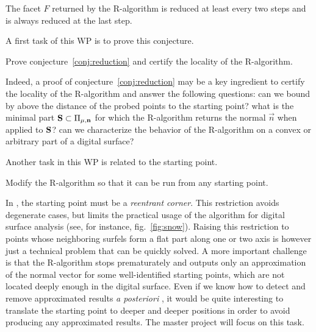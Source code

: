 \begin{Conjecture}
  \label{conj:reduction}
  The facet $F$ returned by the R-algorithm is reduced at least every two steps and
  is always reduced at the last step.  
\end{Conjecture}

A first task of this WP is to prove this conjecture.

\begin{Task}
  \label{task:reduction}
  Prove conjecture~\ref{conj:reduction} and certify the locality of the R-algorithm. 
\end{Task}

Indeed, a proof of conjecture~\ref{conj:reduction} may be a key ingredient
to certify the locality of the R-algorithm and answer
the following questions: can we bound by above the distance of the probed
points to the starting point? 
what is the minimal part $\mathbf{S} \subset \Pi_{\mu,\mathbf{n}}$ for which the
R-algorithm returns the normal $\vec{n}$ when applied to $\mathbf{S}$?
can we characterize the behavior of the R-algorithm on a convex or arbitrary
part of a digital surface?

Another task in this WP is related to the starting point.

\begin{Task}
  \label{task:start}
  Modify the R-algorithm so that it can be run from any starting point. 
\end{Task}

In \cite{LPRJMIV2017}, the starting point must be a \emph{reentrant corner}.
This restriction avoids degenerate cases, but
limits the practical usage of the algorithm for digital surface analysis
(see, for instance, fig.~\ref{fig:snow}). Raising this restriction to points whose neighboring
surfels form a flat part along one or two axis is however just a technical
problem that can be quickly solved. A more important challenge is that the R-algorithm
stops prematurately and outputs only an approximation of the normal vector for some
well-identified starting points, which are not located deeply enough in the digital
surface. Even if we know how to detect and remove approximated results
\emph{a posteriori} \cite{LPRJMIV2017}, it would be quite interesting to translate
the starting point to deeper and deeper positions in order to avoid producing any
approximated results. The master project will focus on this task. %



